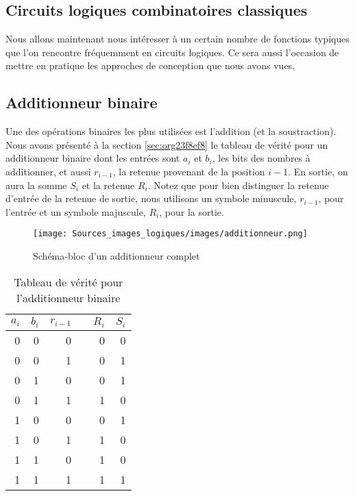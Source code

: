 \documentclass[11pt]{article}
\begin{document}
\subsection{Circuits logiques combinatoires classiques}
\label{sec:orgd845774}

Nous allons maintenant nous intéresser à un certain nombre de
fonctions typiques que l'on rencontre fréquemment en circuits
logiques. Ce sera aussi l'occasion de mettre en pratique les approches
de conception que nous avons vues.


\subsection{Additionneur binaire}
\label{sec:orgbf35405}

Une des opérations binaires les plus utilisées est l'addition (et la
soustraction). Nous avons présenté à la section \ref{sec:org23f8ef8} le tableau de vérité pour un additionneur binaire dont les
entrées sont \(a_{i}\) et \(b_{i}\), les bits des nombres à
additionner, et aussi \(r_{i-1}\), la retenue provenant de la position
\(i-1\). En sortie, on aura la somme \(S_{i}\) et la retenue
\(R_{i}\). Notez que pour bien distinguer la retenue d'entrée de la
retenue de sortie, nous utilisons un symbole minuscule, \(r_{i-1}\),
pour l'entrée et un symbole majuscule, \(R_{i}\), pour la sortie. 

\begin{figure}[htbp]
\centering
\texttt{[image: Sources\_images\_logiques/images/additionneur.png]}
\caption{\label{fig:orga25ec16}Schéma-bloc d'un additionneur complet}
\end{figure}

\begin{table}[htbp]
\caption{\label{tab:orgc5dd9fa}Tableau de vérité pour l'additionneur binaire}
\centering
\begin{tabular}{rrrlrr}
\(a_{i}\) & \(b_{i}\) & \(r_{i-1}\) &  & \(R_{i}\) & \(S_{i}\)\\
\hline
0 & 0 & 0 &  & 0 & 0\\
0 & 0 & 1 &  & 0 & 1\\
0 & 1 & 0 &  & 0 & 1\\
0 & 1 & 1 &  & 1 & 0\\
1 & 0 & 0 &  & 0 & 1\\
1 & 0 & 1 &  & 1 & 0\\
1 & 1 & 0 &  & 1 & 0\\
1 & 1 & 1 &  & 1 & 1\\
\end{tabular}
\end{table}
\end{document}
